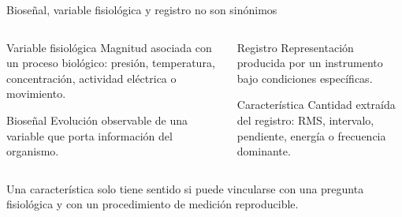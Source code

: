 \documentclass[
  ignorenonframetext,
  aspectratio=169,
  spanish,
  professionalfonts]{beamer}
\begin{document}
\begin{frame}{Bioseñal, variable fisiológica y registro no son
sinónimos}
\protect{}\label{bioseuxf1al-variable-fisioluxf3gica-y-registro-no-son-sinuxf3nimos}
\begin{columns}[T]
\begin{column}{0.48\linewidth}
\begin{block}{Variable fisiológica}
\protect{}\label{variable-fisioluxf3gica}
Magnitud asociada con un proceso biológico: presión, temperatura,
concentración, actividad eléctrica o movimiento.
\end{block}

\begin{block}{Bioseñal}
\protect{}\label{bioseuxf1al}
Evolución observable de una variable que porta información del
organismo.
\end{block}
\end{column}

\begin{column}{0.48\linewidth}
\begin{block}{Registro}
\protect{}\label{registro}
Representación producida por un instrumento bajo condiciones
específicas.
\end{block}

\begin{block}{Característica}
\protect{}\label{caracteruxedstica}
Cantidad extraída del registro: RMS, intervalo, pendiente, energía o
frecuencia dominante.
\end{block}
\end{column}
\end{columns}

\begin{tcolorbox}[enhanced jigsaw, arc=.35mm, bottomrule=.15mm, bottomtitle=1mm, breakable, colback=white, colbacktitle=quarto-callout-important-color!10!white, colframe=quarto-callout-important-color-frame, coltitle=black, left=2mm, leftrule=.75mm, opacityback=0, opacitybacktitle=0.6, rightrule=.15mm, title={Consecuencia}, titlerule=0mm, toprule=.15mm, toptitle=1mm]

Una característica solo tiene sentido si puede vincularse con una
pregunta fisiológica y con un procedimiento de medición reproducible.

\end{tcolorbox}
\end{frame}
\end{document}
